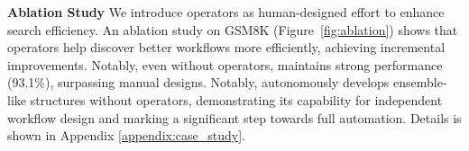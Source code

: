 \noindent\textbf{Ablation Study}
\label{sec:ablation}
We introduce operators as human-designed effort to enhance search efficiency. An ablation study on GSM8K (Figure~\ref{fig:ablation}) shows that operators help \model discover better workflows more efficiently, achieving incremental improvements. Notably, even without operators, \model maintains strong performance (93.1\%), surpassing manual designs. Notably, \model autonomously develops ensemble-like structures without operators, demonstrating its capability for independent workflow design and marking a significant step towards full automation. Details is shown in Appendix \ref{appendix:case_study}.






